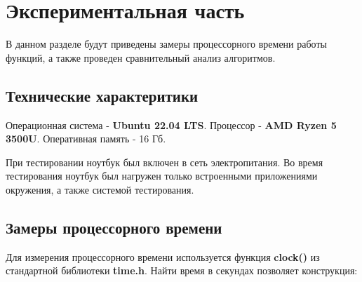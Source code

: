 \section{Экспериментальная часть}
В данном разделе будут приведены замеры процессорного времени работы функций, а также
проведен сравнительный анализ алгоритмов.
\subsection{Технические характеритики}
Операционная система - \textbf{Ubuntu 22.04 LTS}\cite{ubuntu}.
Процессор - \textbf{AMD Ryzen 5 3500U}.
Оперативная память - 16 Гб.

При тестировании ноутбук был включен в сеть электропитания. Во время тестирования ноутбук был нагружен только встроенными приложениями
окружения, а также системой тестирования.
\subsection{Замеры процессорного времени}
Для измерения процессорного времени используется функция \textbf{clock()} из стандартной библиотеки \textbf{time.h}.
Найти время в секундах позволяет конструкция:

